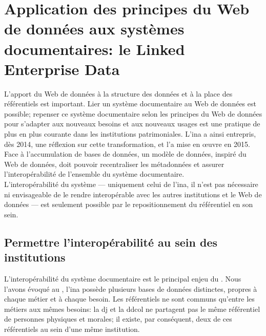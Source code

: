 \section{\label{III-B-1}Application des principes du Web de données aux systèmes documentaires: le Linked Enterprise Data}

L'apport du Web de données à la structure des données et à la place des référentiels est important. Lier un système documentaire au Web de données est possible; repenser ce système documentaire selon les principes du Web de données pour s'adapter aux nouveaux besoins et aux nouveaux usages est une pratique de plus en plus courante dans les institutions patrimoniales. L'\ac{ina} a ainsi entrepris, dès 2014, une réflexion sur cette transformation, et l'a mise en œuvre en 2015. Face à l'accumulation de bases de données, un modèle de données, inspiré du Web de données, doit pouvoir recentraliser les métadonnées et assurer l'interopérabilité de l'ensemble du système documentaire.\\

L'interopérabilité du système --- uniquement celui de l'\ac{ina}, il n'est pas nécessaire ni envisageable de le rendre interopérable avec les autres institutions et le Web de données --- est seulement possible par le repositionnement du référentiel en son sein.

\subsection{\label{III-B-1-a}Permettre l'interopérabilité au sein des institutions}

L'interopérabilité du système documentaire est le principal enjeu du \ldd. Nous l'avons évoqué au , l'\ac{ina} possède plusieurs bases de données distinctes, propres à chaque métier et à chaque besoin. Les référentiels ne sont communs qu'entre les métiers aux mêmes besoins: la \ac{dj} et la \ac{ddcol} ne partagent pas le même référentiel de personnes physiques et morales; il existe, par conséquent, deux de ces référentiels au sein d'une même institution.\\


